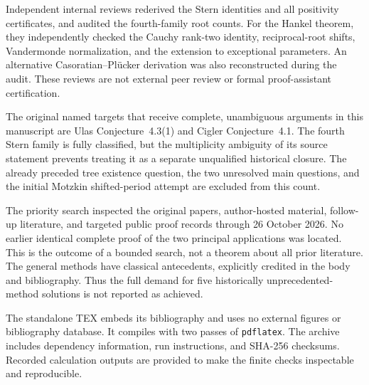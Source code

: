 \documentclass[11pt,a4paper]{article}
\theoremstyle{definition}\newtheorem{definition}[theorem]{Definition}
\theoremstyle{remark}\newtheorem{remark}[theorem]{Remark}
\begin{document}
Independent internal reviews rederived the Stern identities and all
positivity certificates, and audited the fourth-family root counts.
For the Hankel theorem, they independently checked the Cauchy rank-two
identity, reciprocal-root shifts, Vandermonde normalization, and the
extension to exceptional parameters. An alternative Casoratian--Pl\"ucker
derivation was also reconstructed during the audit. These reviews are
not external peer review or formal proof-assistant certification.

The original named targets that receive complete, unambiguous arguments
in this manuscript are Ulas Conjecture~4.3(1) and Cigler Conjecture~4.1.
The fourth Stern family is fully classified, but the multiplicity
ambiguity of its source statement prevents treating it as a separate
unqualified historical closure. The already preceded tree existence
question, the two unresolved main questions, and the initial Motzkin
shifted-period attempt are excluded from this count.

The priority search inspected the original papers, author-hosted
material, follow-up literature, and targeted public proof records through
26 October 2026. No earlier identical complete proof of the two principal
applications was located. This is the outcome of a bounded search, not
a theorem about all prior literature. The general methods have classical
antecedents, explicitly credited in the body and bibliography. Thus the
full demand for five historically unprecedented-method solutions is not
reported as achieved.

The standalone TEX embeds its bibliography and uses no external figures
or bibliography database. It compiles with two passes of
\texttt{pdflatex}. The archive includes dependency information, run
instructions, and SHA-256 checksums. Recorded calculation outputs are
provided to make the finite checks inspectable and reproducible.
\end{document}
